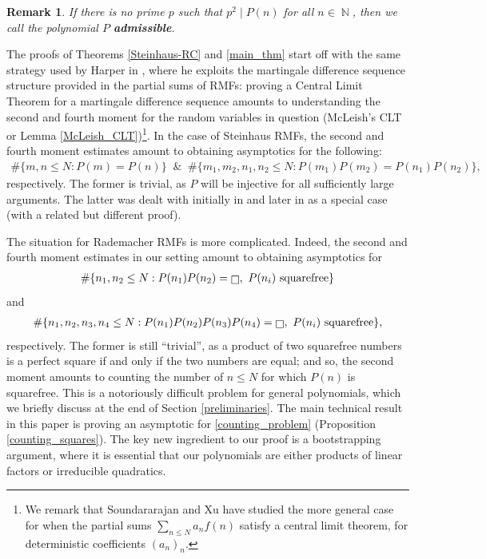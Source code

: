 \documentclass[11pts]{amsart}
\numberwithin{equation}{section}
\newtheorem{rem}{Remark}[section]
\DeclareMathOperator{\N}{\mathbb{N}}
\let\oldsquare\square
\renewcommand{\square}[1][-1pt]{%
 {\raisebox{#1}{$\oldsquare$}}%
}
\begin{document}
\begin{rem}
    If there is no prime $p$ such that $p^2\mid P(n)$ for all $n\in \N$, then we call the polynomial $P$ \textbf{admissible}.
\end{rem}

The proofs of Theorems \ref{Steinhaus-RC} and \ref{main_thm} start off with the same strategy used by Harper in \cite{Harper_Martingale}, where he exploits the martingale difference sequence structure provided in the partial sums of RMFs: proving a Central Limit Theorem for a martingale difference sequence amounts to understanding the second and fourth moment for the random variables in question (McLeish's CLT \cite{McLeish} or Lemma \ref{McLeish_CLT})\footnote{We remark that Soundararajan and Xu \cite{Xu_CentralLimitTheorems} have studied the more general case for when the partial sums $\sum_{n\leq N}a_nf(n)$ satisfy a central limit theorem, for deterministic coefficients $(a_n)_n$.}. In the case of Steinhaus RMFs, the second and fourth moment estimates amount to obtaining asymptotics for the following:
\begin{align*}
\#\{m,n\leq N: P(m)=P(n)\}\;\;\&\;\;\#\{m_1,m_2,n_1,n_2\leq N: P(m_1)P(m_2)=P(n_1)P(n_2)\},
\end{align*}
respectively. The former is trivial, as $P$ will be injective for all sufficiently large arguments. The latter was dealt with initially in \cite{Oleksiy-RandomChowla} and later in \cite{Wang-Xu} as a special case (with a related but different proof).

The situation for Rademacher RMFs is more complicated. Indeed, the second and fourth moment estimates in our setting amount to obtaining asymptotics for
\begin{align}
\#\{n_1,n_2\leq N:P(n_1)P(n_2)=\square,\text{  $P(n_i)$ squarefree}\}
\end{align}
and
\begin{align}
\label{counting_problem}
\#\{n_1,n_2,n_3,n_4\leq N: P(n_1)P(n_2)P(n_3)P(n_4)=\square,\text{  $P(n_i)$ squarefree}\},
\end{align}
respectively. The former is still ``trivial'', as a product of two squarefree numbers is a perfect square if and only if the two numbers are equal; and so, the second moment amounts to counting the number of $n\leq N$ for which $P(n)$ is squarefree. This is a notoriously difficult problem for general polynomials, which we briefly discuss at the end of Section \ref{preliminaries}. The main technical result in this paper is proving an asymptotic for \eqref{counting_problem} (Proposition \ref{counting_squares}). The key new ingredient to our proof is a bootstrapping argument, where it is essential that our polynomials are either products of linear factors or irreducible quadratics.
\end{document}
